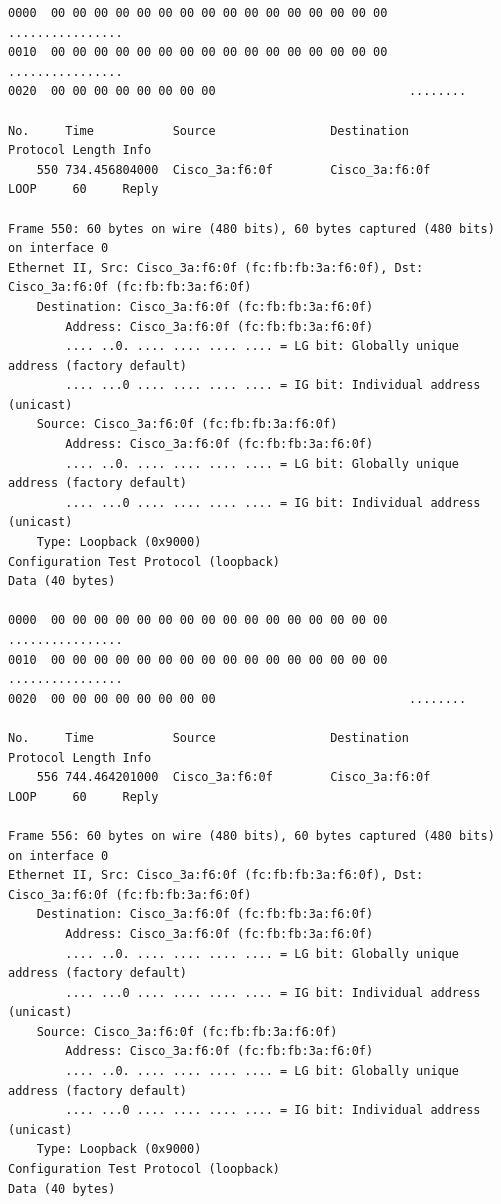 \documentclass[a4paper,11pt]{article}
\begin{document}
\begin{lstlisting}
0000  00 00 00 00 00 00 00 00 00 00 00 00 00 00 00 00   ................
0010  00 00 00 00 00 00 00 00 00 00 00 00 00 00 00 00   ................
0020  00 00 00 00 00 00 00 00                           ........

No.     Time           Source                Destination           Protocol Length Info
    550 734.456804000  Cisco_3a:f6:0f        Cisco_3a:f6:0f        LOOP     60     Reply

Frame 550: 60 bytes on wire (480 bits), 60 bytes captured (480 bits) on interface 0
Ethernet II, Src: Cisco_3a:f6:0f (fc:fb:fb:3a:f6:0f), Dst: Cisco_3a:f6:0f (fc:fb:fb:3a:f6:0f)
    Destination: Cisco_3a:f6:0f (fc:fb:fb:3a:f6:0f)
        Address: Cisco_3a:f6:0f (fc:fb:fb:3a:f6:0f)
        .... ..0. .... .... .... .... = LG bit: Globally unique address (factory default)
        .... ...0 .... .... .... .... = IG bit: Individual address (unicast)
    Source: Cisco_3a:f6:0f (fc:fb:fb:3a:f6:0f)
        Address: Cisco_3a:f6:0f (fc:fb:fb:3a:f6:0f)
        .... ..0. .... .... .... .... = LG bit: Globally unique address (factory default)
        .... ...0 .... .... .... .... = IG bit: Individual address (unicast)
    Type: Loopback (0x9000)
Configuration Test Protocol (loopback)
Data (40 bytes)

0000  00 00 00 00 00 00 00 00 00 00 00 00 00 00 00 00   ................
0010  00 00 00 00 00 00 00 00 00 00 00 00 00 00 00 00   ................
0020  00 00 00 00 00 00 00 00                           ........

No.     Time           Source                Destination           Protocol Length Info
    556 744.464201000  Cisco_3a:f6:0f        Cisco_3a:f6:0f        LOOP     60     Reply

Frame 556: 60 bytes on wire (480 bits), 60 bytes captured (480 bits) on interface 0
Ethernet II, Src: Cisco_3a:f6:0f (fc:fb:fb:3a:f6:0f), Dst: Cisco_3a:f6:0f (fc:fb:fb:3a:f6:0f)
    Destination: Cisco_3a:f6:0f (fc:fb:fb:3a:f6:0f)
        Address: Cisco_3a:f6:0f (fc:fb:fb:3a:f6:0f)
        .... ..0. .... .... .... .... = LG bit: Globally unique address (factory default)
        .... ...0 .... .... .... .... = IG bit: Individual address (unicast)
    Source: Cisco_3a:f6:0f (fc:fb:fb:3a:f6:0f)
        Address: Cisco_3a:f6:0f (fc:fb:fb:3a:f6:0f)
        .... ..0. .... .... .... .... = LG bit: Globally unique address (factory default)
        .... ...0 .... .... .... .... = IG bit: Individual address (unicast)
    Type: Loopback (0x9000)
Configuration Test Protocol (loopback)
Data (40 bytes)


\end{lstlisting}
\end{document}
